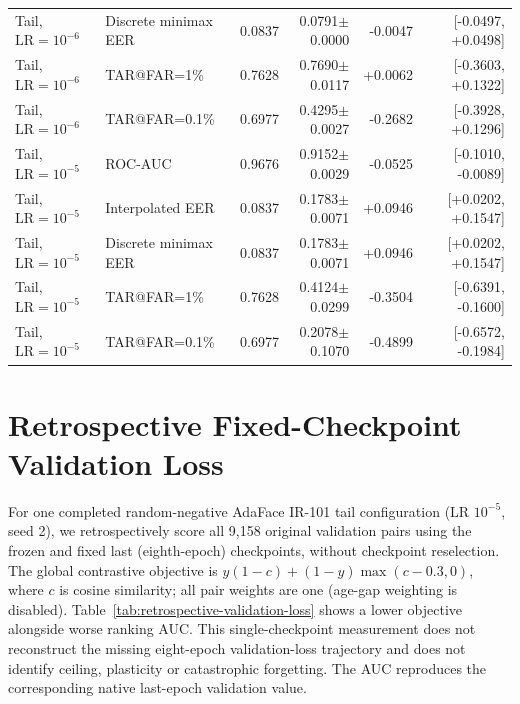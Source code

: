 \documentclass[journal]{IEEEtran}
\begin{document}
\begin{table}[!t]
\begin{tabular}{llrrrr}
Tail, $\mathrm{LR}=10^{-6}$ & Discrete minimax EER & 0.0837 & 0.0791$\pm$0.0000 & -0.0047 & [-0.0497, +0.0498] \\
Tail, $\mathrm{LR}=10^{-6}$ & TAR@FAR=1\% & 0.7628 & 0.7690$\pm$0.0117 & +0.0062 & [-0.3603, +0.1322] \\
Tail, $\mathrm{LR}=10^{-6}$ & TAR@FAR=0.1\% & 0.6977 & 0.4295$\pm$0.0027 & -0.2682 & [-0.3928, +0.1296] \\
Tail, $\mathrm{LR}=10^{-5}$ & ROC-AUC & 0.9676 & 0.9152$\pm$0.0029 & -0.0525 & [-0.1010, -0.0089] \\
Tail, $\mathrm{LR}=10^{-5}$ & Interpolated EER & 0.0837 & 0.1783$\pm$0.0071 & +0.0946 & [+0.0202, +0.1547] \\
Tail, $\mathrm{LR}=10^{-5}$ & Discrete minimax EER & 0.0837 & 0.1783$\pm$0.0071 & +0.0946 & [+0.0202, +0.1547] \\
Tail, $\mathrm{LR}=10^{-5}$ & TAR@FAR=1\% & 0.7628 & 0.4124$\pm$0.0299 & -0.3504 & [-0.6391, -0.1600] \\
Tail, $\mathrm{LR}=10^{-5}$ & TAR@FAR=0.1\% & 0.6977 & 0.2078$\pm$0.1070 & -0.4899 & [-0.6572, -0.1984] \\
\bottomrule
\end{tabular}
\end{table}
\clearpage

\section{Retrospective Fixed-Checkpoint Validation Loss}\label{sec:retrospective-validation-loss}
For one completed random-negative AdaFace IR-101 tail configuration
(LR $10^{-5}$, seed 2), we retrospectively score all 9,158 original validation
pairs using the frozen and fixed last (eighth-epoch) checkpoints, without
checkpoint reselection. The global contrastive objective is
$y(1-c)+(1-y)\max(c-0.3,0)$, where $c$ is cosine similarity; all pair weights
are one (age-gap weighting is disabled). Table~\ref{tab:retrospective-validation-loss}
shows a lower objective alongside worse ranking AUC. This single-checkpoint
measurement does not reconstruct the missing eight-epoch validation-loss
trajectory and does not identify ceiling, plasticity or catastrophic forgetting.
The AUC reproduces the corresponding native last-epoch validation value.
\end{document}
